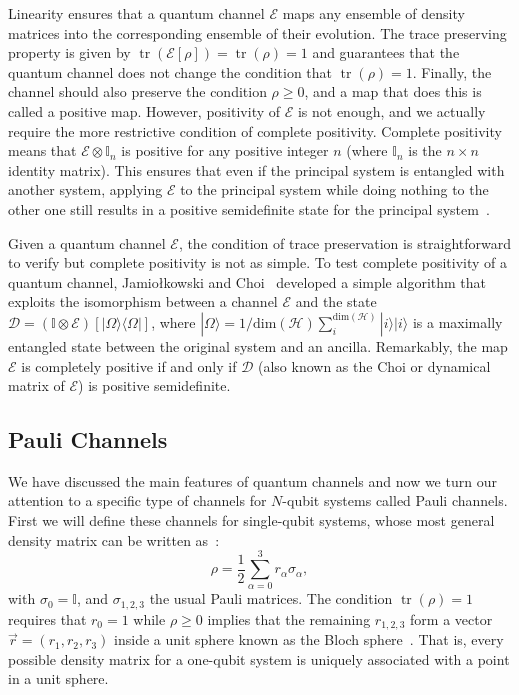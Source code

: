 \documentclass[10pt,letterpaper]{article} %
\DeclareMathOperator{\tr}{tr}
\begin{document}
Linearity ensures that a quantum channel $\mathcal{E}$ maps any ensemble
of density matrices into the corresponding ensemble of their evolution.
The trace preserving property is given by $\tr (\mathcal{E}[\rho]) = \tr (\rho) =
1$ and guarantees that the quantum channel does not change the condition that $\tr(\rho) = 1$.
Finally, the channel should also preserve
the condition $\rho \geq 0$, and a map that does this is called a positive map.
However, positivity of $\mathcal{E}$ is not enough, 
and we actually require the more restrictive condition of complete positivity.
Complete positivity means that
$\mathcal{E} \otimes \mathbb{I}_n$ is positive for
any positive integer $n$ 
(where $\mathbb{I}_n$ is the $n\times n$ identity matrix).
This ensures that even if the principal system is entangled with another system,
applying $\mathcal{E}$ to the principal system while doing nothing to the
 other one still results in  a positive semidefinite state for the principal system~\cite{chuangbook}. 

Given a quantum channel $\mathcal{E}$, 
the condition of trace preservation is straightforward to verify but complete positivity is not as simple.
To test complete positivity of a quantum channel, 
Jamiołkowski and Choi~\cite{choi,jamil} developed a simple algorithm that exploits the
isomorphism between a channel $\mathcal{E}$ and the state $\mathcal{D} =
(\mathbb{I} \otimes \mathcal{E}) [|\Omega \rangle \langle  \Omega|]$, where
$|\Omega\rangle = 1/\text{dim}(\mathcal{H}) \sum_{i}^{\text{dim}(\mathcal{H})} |i \rangle |i \rangle$ is a maximally entangled state between the original system and
an ancilla.  Remarkably, the map $\mathcal{E}$
is completely positive if and only if $\mathcal{D}$ (also known as the Choi or
dynamical matrix of $\mathcal{E}$) is positive semidefinite.

\subsection{Pauli Channels} 
\label{subsec: Pauli Channels} %

We have discussed the main features of quantum channels and 
now we turn our attention to a specific 
type of channels for $N$-qubit systems called Pauli channels.
First we will define these channels for single-qubit systems,
whose most general density matrix can be written as~\cite{chuangbook}:
\begin{equation}
\label{eq: Density Matrix}
\rho = \dfrac{1}{2} \sum_{\alpha=0}^{3} r_{\alpha} \sigma_{\alpha},
\end{equation}
with $\sigma_0 = \mathbb{I}$, and $\sigma_{1,2,3}$ the usual Pauli matrices.
The condition $\tr(\rho) = 1$ requires that $r_0 = 1$ while $\rho \geq 0$ 
implies that the remaining $r_{1,2,3}$ form
a vector $\vec{r}= (r_1,r_2,r_3)$ inside a unit sphere known as the Bloch sphere~\cite{Marinescu}.
That is, every possible density matrix for a one-qubit
system is uniquely associated with a point in a unit sphere. 
\end{document}
